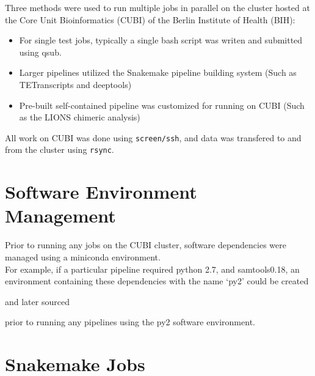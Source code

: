 \documentclass[onehalf,12pt]{beavtex}
\begin{document}
  Three methods were used to run multiple jobs in parallel on the cluster
  hosted at the Core Unit Bioinformatics (CUBI) of the Berlin Institute of
  Health (BIH):
  
  \begin{itemize}
  \item
    For single test jobs, typically a single bash script was writen and
    submitted using qsub.
  \item
    Larger pipelines utilized the Snakemake pipeline building system (Such
    as TETranscripts and deeptools)
  \item
    Pre-built self-contained pipeline was customized for running on CUBI
    (Such as the LIONS chimeric analysis)
  \end{itemize}
  
  All work on CUBI was done using \texttt{screen/ssh}, and data was
  transfered to and from the cluster using \texttt{rsync}.
  
  \section{Software Environment
  Management}\label{software-environment-management}
  
  Prior to running any jobs on the CUBI cluster, software dependencies
  were managed using a miniconda environment.\\
  For example, if a particular pipeline required python 2.7, and
  samtools0.18, an environment containing these dependencies with the name
  `py2' could be created
  
  \begin{Shaded}
  \begin{Highlighting}[]
  \end{Highlighting}
  \end{Shaded}
  
  and later sourced
  
  \begin{Shaded}
  \begin{Highlighting}[]
  \end{Highlighting}
  \end{Shaded}
  
  prior to running any pipelines using the py2 software environment.
  
  \section{Snakemake Jobs}\label{snakemake-jobs}
  
\end{document}
